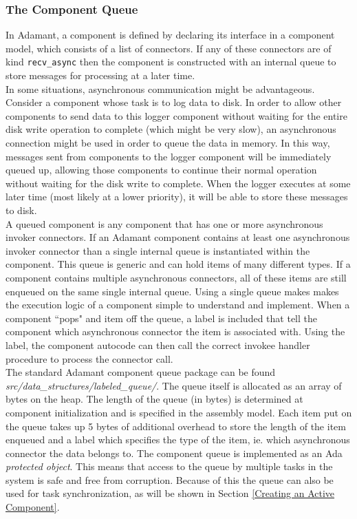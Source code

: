 \subsubsection{The Component Queue} \label{The Component Queue}

In Adamant, a component is defined by declaring its interface in a component model, which consists of a list of connectors. If any of these connectors are of kind \texttt{recv\_async} then the component is constructed with an internal queue to store messages for processing at a later time.  \\

In some situations, asynchronous communication might be advantageous. Consider a component whose task is to log data to disk. In order to allow other components to send data to this logger component without waiting for the entire disk write operation to complete (which might be very slow), an asynchronous connection might be used in order to queue the data in memory. In this way, messages sent from components to the logger component will be immediately queued up, allowing those components to continue their normal operation without waiting for the disk write to complete. When the logger executes at some later time (most likely at a lower priority), it will be able to store these messages to disk. \\

A queued component is any component that has one or more asynchronous invoker connectors. If an Adamant component contains at least one asynchronous invoker connector than a single internal queue is instantiated within the component. This queue is generic and can hold items of many different types. If a component contains multiple asynchronous connectors, all of these items are still enqueued on the same single internal queue. Using a single queue makes makes the execution logic of a component simple to understand and implement. When a component ``pops" and item off the queue, a label is included that tell the component which asynchronous connector the item is associated with. Using the label, the component autocode can then call the correct invokee handler procedure to process the connector call. \\

The standard Adamant component queue package can be found \textit{src/data\_structures/labeled\_queue/}. The queue itself is allocated as an array of bytes on the heap. The length of the queue (in bytes) is determined at component initialization and is specified in the assembly model. Each item put on the queue takes up 5 bytes of additional overhead to store the length of the item enqueued and a label which specifies the type of the item, ie. which asynchronous connector the data belongs to. The component queue is implemented as an Ada \textit{protected object}. This means that access to the queue by multiple tasks in the system is safe and free from corruption. Because of this the queue can also be used for task synchronization, as will be shown in Section \ref{Creating an Active Component}. \\

